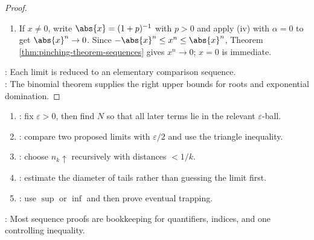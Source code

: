 \begin{theorem}
\begin{proof}
\begin{enumerate}[label=(\roman*)]
Hence $0<\frac{n^\alpha}{(1+p)^n}<\frac{2^kk!}{p^k}n^{\alpha-k}$, and $n^{\alpha-k}\to0$ by (i). Apply Theorem \ref{thm:pinching-theorem-sequences}.
\item If $x\neq0$, write $\abs{x}=(1+p)^{-1}$ with $p>0$ and apply (iv) with $\alpha=0$ to get $\abs{x}^n\to0$. Since $-\abs{x}^n\leq x^n\leq\abs{x}^n$, Theorem \ref{thm:pinching-theorem-sequences} gives $x^n\to0$; $x=0$ is immediate.
\end{enumerate}
: Each limit is reduced to an elementary comparison sequence.\\
: The binomial theorem supplies the right upper bounds for roots and exponential domination.
\end{proof}
\end{theorem}

\begin{method} \label{meth:sequence-proof-patterns}\label{meth:sequence-proof-patterns-source-todo} 
\begin{enumerate}[label=(\roman*)]
\setlength{\itemsep}{0pt}
\item {}: fix $\varepsilon>0$, then find $N$ so that all later terms lie in the relevant $\varepsilon$-ball.
\item {}: compare two proposed limits with $\varepsilon/2$ and use the triangle inequality.
\item {}: choose $n_k\uparrow$ recursively with distances $<1/k$.
\item {}: estimate the diameter of tails rather than guessing the limit first.
\item {}: use $\sup$ or $\inf$ and then prove eventual trapping.
\end{enumerate}
: Most sequence proofs are bookkeeping for quantifiers, indices, and one controlling inequality.
\end{method}
